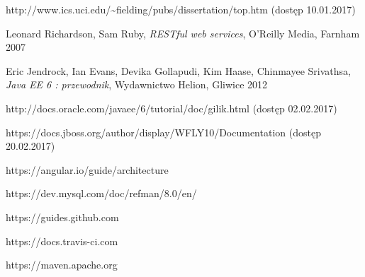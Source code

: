 \begin{thebibliography}{99}

http://www.ics.uci.edu/{\textasciitilde}fielding/pubs/dissertation/top.htm (dostęp 10.01.2017)

Leonard Richardson, Sam Ruby,
\emph{RESTful web services},
 O’Reilly Media, Farnham 2007

Eric Jendrock, Ian Evans, Devika Gollapudi, Kim Haase, Chinmayee Srivathsa,
\emph{Java EE 6 : przewodnik},
Wydawnictwo Helion, Gliwice 2012

http://docs.oracle.com/javaee/6/tutorial/doc/gilik.html (dostęp 02.02.2017)

https://docs.jboss.org/author/display/WFLY10/Documentation (dostęp 20.02.2017)

https://angular.io/guide/architecture

https://dev.mysql.com/doc/refman/8.0/en/

https://guides.github.com

https://docs.travis-ci.com

https://maven.apache.org

\end{thebibliography}